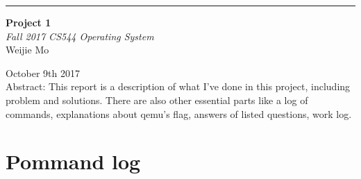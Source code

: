 \documentclass[10pt,draftclsnofoot,peerreview,letterpaper,onecolumn,]{IEEEtran}
\begin{document}
\begin{titlepage} %
	
	\raggedleft %
	
	\rule{1pt}{\textheight} %
	\hspace{0.05\textwidth} %
	\parbox[b]{0.75\textwidth}{ %
		
		{\Huge\bfseries Project 1 }\\[2\baselineskip] %
		{\large\textit{Fall 2017 CS544 Operating System}}\\[4\baselineskip] %
		{\Large Weijie Mo} %
		
		\vspace{0.5\textheight} %
		
		{\noindent October 9th 2017}\\[\baselineskip] %
        {\noindent Abstract:
    This report is a description of what I've done in this project, including problem and solutions. There are also other essential parts like a log of commands, explanations about qemu's flag, answers of listed questions, work log.}\\[\baselineskip] %
	}

\end{titlepage}

\section{Pommand log}
\end{document}
